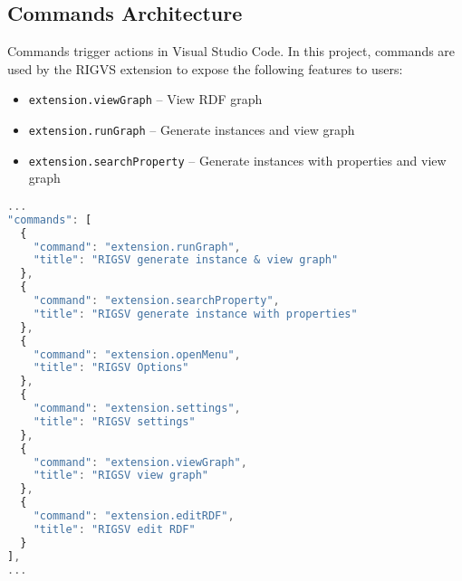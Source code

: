 \subsection{Commands Architecture}
Commands trigger actions in Visual Studio Code. In this project, commands are used by the RIGVS extension to expose the following features to users:
\begin{itemize}
    \item \texttt{extension.viewGraph} – View RDF graph
    \item \texttt{extension.runGraph} – Generate instances and view graph
    \item \texttt{extension.searchProperty} – Generate instances with properties and view graph
\end{itemize}
\bigskip 
\begin{lstlisting}[caption={package.json commands declaration}, label={lst:commands-declaration}, language=JavaScript]
...
"commands": [
  {
    "command": "extension.runGraph",
    "title": "RIGSV generate instance & view graph"
  },
  {
    "command": "extension.searchProperty",
    "title": "RIGSV generate instance with properties"
  },
  {
    "command": "extension.openMenu",
    "title": "RIGSV Options"
  },
  {
    "command": "extension.settings",
    "title": "RIGSV settings"
  },
  {
    "command": "extension.viewGraph",
    "title": "RIGSV view graph"
  },
  {
    "command": "extension.editRDF",
    "title": "RIGSV edit RDF"
  }
],
...
\end{lstlisting}

